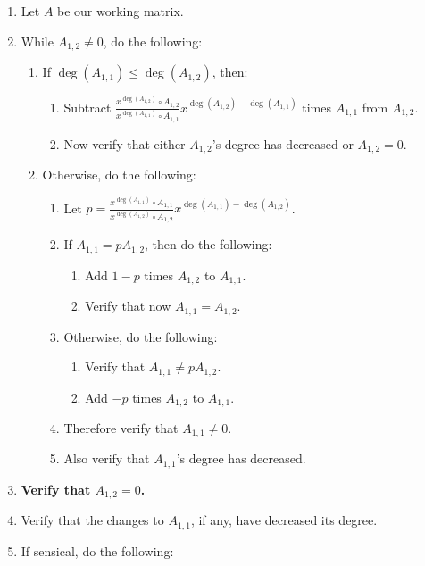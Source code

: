 \documentclass[twocolumn]{article}
\begin{document}
				\begin{enumerate}
					\item Let $A$ be our working matrix.
					\item While $A_{1,2}\ne 0$, do the following:
					\begin{enumerate}
						\item If $\deg(A_{1,1})\le\deg(A_{1,2})$, then:
						\begin{enumerate}
							\item Subtract $\frac{x^{\deg(A_{1,2})}\circ A_{1,2}}{x^{\deg(A_{1,1})}\circ A_{1,1}}x^{\deg(A_{1,2})-\deg(A_{1,1})}$ times $A_{1,1}$ from $A_{1,2}$.
							\item Now verify that either $A_{1,2}$'s degree has decreased or $A_{1,2}=0$.
						\end{enumerate}
						\item Otherwise, do the following:
						\begin{enumerate}
							\item Let $p=\frac{x^{\deg(A_{1,1})}\circ A_{1,1}}{x^{\deg(A_{1,2})}\circ A_{1,2}}x^{\deg(A_{1,1})-\deg(A_{1,2})}$.
							\item If $A_{1,1}=pA_{1,2}$, then do the following:
							\begin{enumerate}
								\item Add $1-p$ times $A_{1,2}$ to $A_{1,1}$.
								\item Verify that now $A_{1,1}=A_{1,2}$.
							\end{enumerate}
							\item Otherwise, do the following:
							\begin{enumerate}
								\item Verify that $A_{1,1}\ne pA_{1,2}$.
								\item Add $-p$ times $A_{1,2}$ to $A_{1,1}$.
							\end{enumerate}
							\item Therefore verify that $A_{1,1}\ne 0$.
							\item Also verify that $A_{1,1}$'s degree has decreased.
						\end{enumerate}
					\end{enumerate}
					\item \textbf{Verify that $A_{1,2}=0$.}
					\item Verify that the changes to $A_{1,1}$, if any, have decreased its degree.
					\item If sensical, do the following:
					\begin{enumerate}

\end{enumerate}
\end{enumerate}
\end{document}

